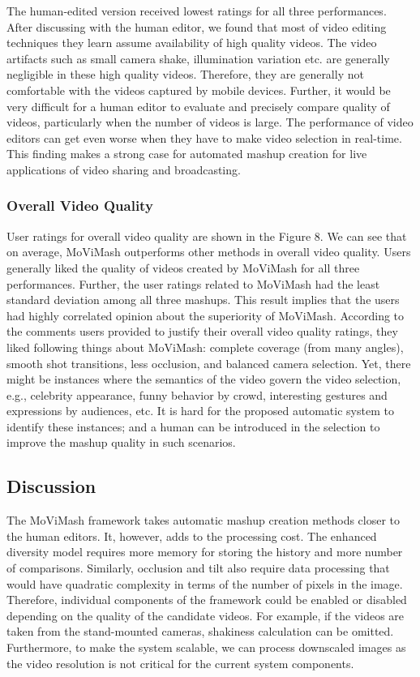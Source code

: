 \documentclass{new}
\begin{document}
The human-edited version received lowest ratings for all three
performances. After discussing with the human editor, we found
that most of video editing techniques they learn assume availability
of high quality videos. The video artifacts such as small camera shake, illumination variation etc. are generally negligible in these
high quality videos. Therefore, they are generally not comfortable
with the videos captured by mobile devices. Further, it would be
very difficult for a human editor to evaluate and precisely compare
quality of videos, particularly when the number of videos is large.
The performance of video editors can get even worse when they
have to make video selection in real-time. This finding makes a
strong case for automated mashup creation for live applications of
video sharing and broadcasting.

\subsubsection{Overall Video Quality}
User ratings for overall video quality are shown in the  Figure 8.
We can see that on average, MoViMash outperforms other methods
in overall video quality. Users generally liked the quality of
videos created by MoViMash for all three performances. Further,
the user ratings related to MoViMash had the least standard deviation
among all three mashups. This result implies that the users
had highly correlated opinion about the superiority of MoViMash.
According to the comments users provided to justify their overall
video quality ratings, they liked following things about MoViMash:
complete coverage (from many angles), smooth shot transitions,
less occlusion, and balanced camera selection. Yet, there might
be instances where the semantics of the video govern the video
selection, e.g., celebrity appearance, funny behavior by crowd, interesting
gestures and expressions by audiences, etc. It is hard for
the proposed automatic system to identify these instances; and a
human can be introduced in the selection to improve the mashup
quality in such scenarios.
\subsection{Discussion}
The MoViMash framework takes automatic mashup creation methods
closer to the human editors. It, however, adds to the processing
cost. The enhanced diversity model requires more memory for storing
the history and more number of comparisons. Similarly, occlusion
and tilt also require data processing that would have quadratic
complexity in terms of the number of pixels in the image. Therefore,
individual components of the framework could be enabled or
disabled depending on the quality of the candidate videos. For example,
if the videos are taken from the stand-mounted cameras,
shakiness calculation can be omitted. Furthermore, to make the
system scalable, we can process downscaled images as the video
resolution is not critical for the current system components.
\end{document}
